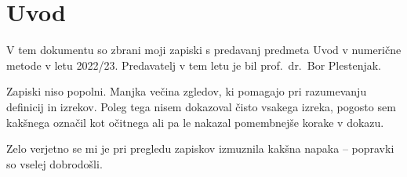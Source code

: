 \section*{Uvod}

V tem dokumentu so zbrani moji zapiski s predavanj predmeta
Uvod v numerične metode v letu 2022/23. Predavatelj v tem letu je bil
prof.~dr.~Bor Plestenjak.

Zapiski niso popolni. Manjka večina zgledov, ki pomagajo pri razumevanju definicij in izrekov. Poleg tega nisem dokazoval čisto vsakega izreka, pogosto sem kakšnega označil kot očitnega ali pa le nakazal pomembnejše korake v dokazu.

Zelo verjetno se mi je pri pregledu zapiskov izmuznila kakšna napaka -- popravki so vselej dobrodošli.